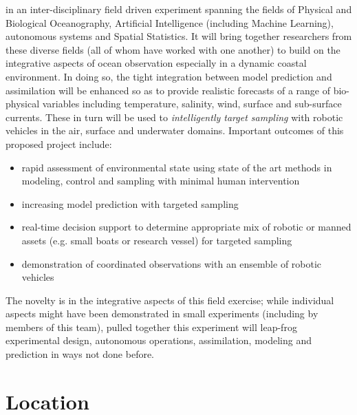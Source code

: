 \proj in an inter-disciplinary field driven experiment spanning the
fields of Physical and Biological Oceanography, Artificial
Intelligence (including Machine Learning), autonomous systems and
Spatial Statistics. It will bring together researchers from these
diverse fields (all of whom have worked with one another) to build on
the integrative aspects of ocean observation especially in a dynamic
coastal environment.  In doing so, the tight integration between model
prediction and assimilation will be enhanced so as to provide
realistic forecasts of a range of bio-physical variables including
temperature, salinity, wind, surface and sub-surface currents. These
in turn will be used to \emph{intelligently target sampling} with
robotic vehicles in the air, surface and underwater domains. Important
outcomes of this proposed project include:

\begin{itemize}[noitemsep,topsep=5pt,parsep=0pt,partopsep=0pt,leftmargin=0.5cm]

\item rapid assessment of environmental state using state of the art
  methods in modeling, control and sampling with minimal human intervention
\item increasing model prediction with targeted sampling
\item real-time decision support to determine appropriate mix of
  robotic or manned assets (e.g. small boats or research vessel) for
  targeted sampling
\item demonstration of coordinated observations with an ensemble of
  robotic vehicles
\end{itemize}

The novelty is in the integrative aspects of this field exercise;
while individual aspects might have been demonstrated in small
experiments (including by members of this team), pulled together this
experiment will leap-frog experimental design, autonomous operations,
assimilation, modeling and prediction in ways not done before.

\section*{Location}

